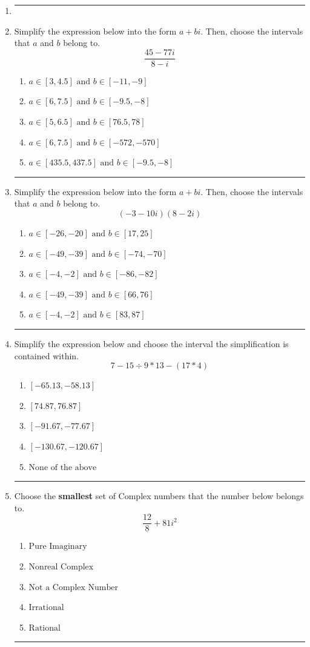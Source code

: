 \documentclass[14pt]{extbook}
\newcommand{\litem}[1]{\item#1\hspace*{-1cm}\rule{\textwidth}{0.4pt}}
\begin{document}
\begin{enumerate}
\litem{
\begin{enumerate}[label=\Alph*.]

\end{enumerate} }
\litem{
Simplify the expression below into the form $a+bi$. Then, choose the intervals that $a$ and $b$ belong to.\[ \frac{45 - 77 i}{8 - i} \]\begin{enumerate}[label=\Alph*.]
\item \( a \in [3, 4.5] \text{ and } b \in [-11, -9] \)
\item \( a \in [6, 7.5] \text{ and } b \in [-9.5, -8] \)
\item \( a \in [5, 6.5] \text{ and } b \in [76.5, 78] \)
\item \( a \in [6, 7.5] \text{ and } b \in [-572, -570] \)
\item \( a \in [435.5, 437.5] \text{ and } b \in [-9.5, -8] \)

\end{enumerate} }
\litem{
Simplify the expression below into the form $a+bi$. Then, choose the intervals that $a$ and $b$ belong to.\[ (-3 - 10 i)(8 - 2 i) \]\begin{enumerate}[label=\Alph*.]
\item \( a \in [-26, -20] \text{ and } b \in [17, 25] \)
\item \( a \in [-49, -39] \text{ and } b \in [-74, -70] \)
\item \( a \in [-4, -2] \text{ and } b \in [-86, -82] \)
\item \( a \in [-49, -39] \text{ and } b \in [66, 76] \)
\item \( a \in [-4, -2] \text{ and } b \in [83, 87] \)

\end{enumerate} }
\litem{
Simplify the expression below and choose the interval the simplification is contained within.\[ 7 - 15 \div 9 * 13 - (17 * 4) \]\begin{enumerate}[label=\Alph*.]
\item \( [-65.13, -58.13] \)
\item \( [74.87, 76.87] \)
\item \( [-91.67, -77.67] \)
\item \( [-130.67, -120.67] \)
\item \( \text{None of the above} \)

\end{enumerate} }
\litem{
Choose the \textbf{smallest} set of Complex numbers that the number below belongs to.\[ \frac{12}{8}+81i^2 \]\begin{enumerate}[label=\Alph*.]
\item \( \text{Pure Imaginary} \)
\item \( \text{Nonreal Complex} \)
\item \( \text{Not a Complex Number} \)
\item \( \text{Irrational} \)
\item \( \text{Rational} \)


\end{enumerate}}
\end{enumerate}
\end{document}
